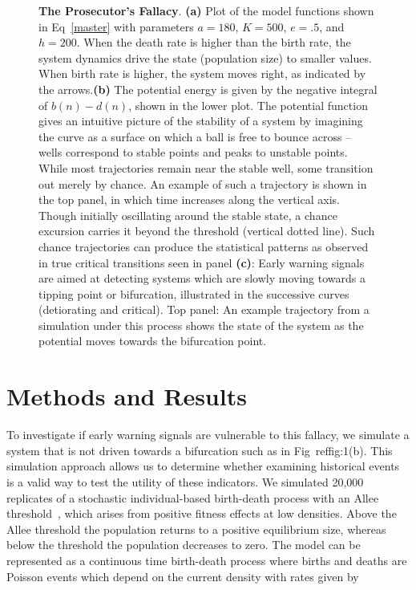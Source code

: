 \documentclass[authoryear,review,12pt]{elsarticle}
\newif\ifhavefigures
\newif\ifnohavefigures %
\begin{document}
\begin{figure}
  \begin{center}
      \ifhavefigures
      \fi
      \ifnohavefigures
        \hspace{\textwidth}
      \fi
      \label{fig:bifurcation}
  \end{center} \caption{\textbf{The Prosecutor's Fallacy}. 
\textbf{(a)} Plot of the model functions shown in Eq~\eqref{master}
with parameters $a=180$, $K=500$, $e=.5$, and $h=200$.  When the death
rate is higher than the birth rate, the system dynamics drive the state
(population size) to smaller values.  When birth rate is higher, the
system moves right, as indicated by the arrows.\textbf{(b)} The potential
energy is given by the negative integral of $b(n)-d(n)$, shown in the
lower plot.   The potential function gives an intuitive picture of
the stability of a system by imagining the curve as a surface on which
a ball is free to bounce across -- wells correspond to stable points
and peaks to unstable points. While most trajectories remain near the
stable well, some transition out merely by chance.  An example of such
a trajectory is shown in the top panel, in which time increases along
the vertical axis. Though initially oscillating around the stable state,
a chance excursion carries it beyond the threshold (vertical dotted line).
Such chance trajectories can produce the statistical patterns as observed
in true critical transitions seen in panel \textbf{(c)}: Early warning
signals  are aimed at detecting systems which are slowly moving towards
a tipping point or bifurcation, illustrated in the successive curves
(detiorating and critical). Top panel: An example trajectory from a
simulation under this process shows the state of the system as the
potential moves towards the bifurcation point.
} \label{fig:1}
\end{figure}




\section{Methods and Results}
To investigate if early warning signals are vulnerable to this fallacy,
we simulate a system that is not driven towards a bifurcation such as
in Fig~ref{fig:1}(b).  This simulation approach allows us to determine whether
examining historical events is a valid way to test the utility of these
indicators.  We simulated 20,000 replicates of a stochastic individual-based
birth-death process with an Allee threshold~\citep{Courchamp2008}, which
arises from positive fitness effects at low densities.  Above the Allee
threshold the population returns to a positive equilibrium size, whereas
below the threshold the population decreases to zero. The model can be represented as a continuous time birth-death process where births and deaths are Poisson events which depend on the current density with rates given by
\end{document}
